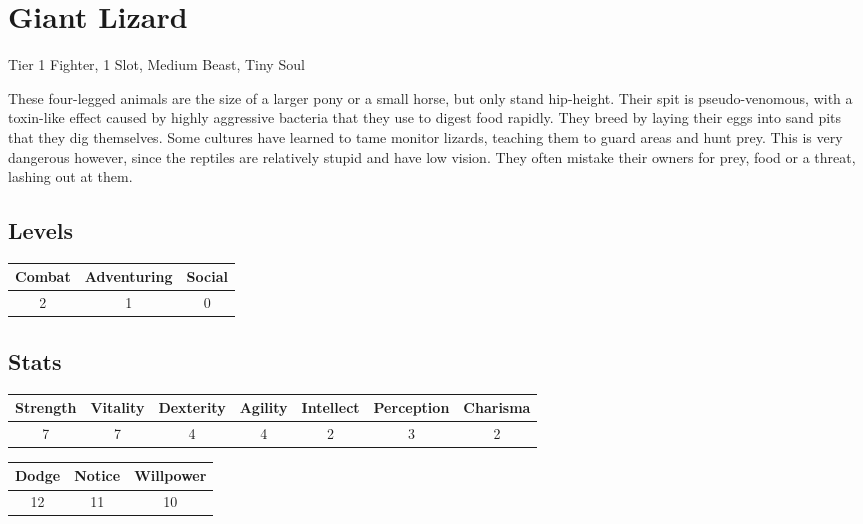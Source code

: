 \section{Giant Lizard}
Tier 1 Fighter, 1 Slot, Medium Beast, Tiny Soul

These four-legged animals are the size of a larger pony or a small horse, but only stand hip-height.
Their spit is pseudo-venomous, with a toxin-like effect caused by highly aggressive bacteria that they use to digest food rapidly.
They breed by laying their eggs into sand pits that they dig themselves.
Some cultures have learned to tame monitor lizards, teaching them to guard areas and hunt prey.
This is very dangerous however, since the reptiles are relatively stupid and have low vision.
They often mistake their owners for prey, food or a threat, lashing out at them.

\subsection{Levels}
\begin{minipage}[H]{1\textwidth}
    \centering
    \begin{tabular}[c]{|c | c | c|}
        \hline
        Combat & Adventuring & Social\\
        \hline
        2 & 1 & 0\\
        \hline
    \end{tabular}
\end{minipage}

\subsection{Stats}
\begin{minipage}[H]{1\textwidth}
    \centering
    \begin{tabular}[c]{|c | c | c | c | c | c | c|}
        \hline
        Strength & Vitality & Dexterity & Agility & Intellect & Perception & Charisma\\
        \hline
        7 & 7 & 4 & 4 & 2 & 3 & 2\\
        \hline
    \end{tabular}
\end{minipage}
\bigbreak

\begin{minipage}[H]{1\textwidth}
    \centering
    \begin{tabular}[c]{|c | c | c|}
        \hline
        Dodge & Notice & Willpower\\
        \hline
        12 & 11 & 10\\
        \hline
    \end{tabular}
\end{minipage}

